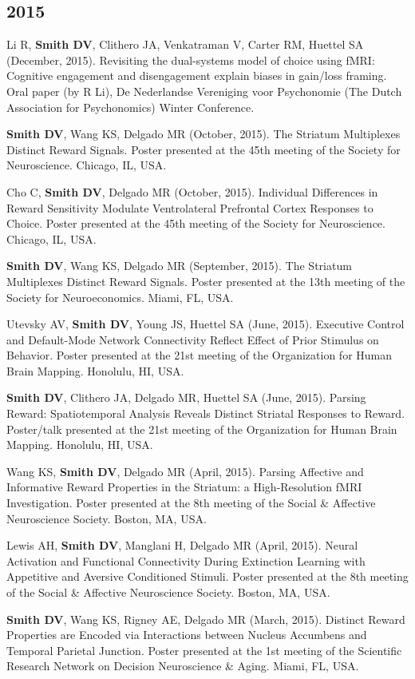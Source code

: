 \documentclass[11pt, letterpaper]{article}
\begin{document}
\subsection*{2015}
\begin{hangparas}{.5in}{1}
Li R, \textbf{Smith DV}, Clithero JA, Venkatraman V, Carter RM, Huettel SA (December, 2015). Revisiting the dual-systems model of choice using fMRI: Cognitive engagement and disengagement explain biases in gain/loss framing. Oral paper (by R Li), De Nederlandse Vereniging voor Psychonomie (The Dutch Association for Psychonomics) Winter Conference.

\textbf{Smith DV}, Wang KS, Delgado MR (October, 2015). The Striatum Multiplexes Distinct Reward Signals. Poster presented at the 45th meeting of the Society for Neuroscience. Chicago, IL, USA.

Cho C, \textbf{Smith DV}, Delgado MR (October, 2015). Individual Differences in Reward Sensitivity Modulate Ventrolateral Prefrontal Cortex Responses to Choice. Poster presented at the 45th meeting of the Society for Neuroscience. Chicago, IL, USA.

\textbf{Smith DV}, Wang KS, Delgado MR (September, 2015). The Striatum Multiplexes Distinct Reward Signals. Poster presented at the 13th meeting of the Society for Neuroeconomics. Miami, FL, USA.

Utevsky AV, \textbf{Smith DV}, Young JS, Huettel SA (June, 2015). Executive Control and Default-Mode Network Connectivity Reflect Effect of Prior Stimulus on Behavior. Poster presented at the 21st meeting of the Organization for Human Brain Mapping. Honolulu, HI, USA.

\textbf{Smith DV}, Clithero JA, Delgado MR, Huettel SA (June, 2015). Parsing Reward: Spatiotemporal Analysis Reveals Distinct Striatal Responses to Reward. Poster/talk presented at the 21st meeting of the Organization for Human Brain Mapping. Honolulu, HI, USA.

Wang KS, \textbf{Smith DV}, Delgado MR (April, 2015). Parsing Affective and Informative Reward Properties in the Striatum: a High-Resolution fMRI Investigation. Poster presented at the 8th meeting of the Social \& Affective Neuroscience Society. Boston, MA, USA.

Lewis AH, \textbf{Smith DV}, Manglani H, Delgado MR (April, 2015). Neural Activation and Functional Connectivity During Extinction Learning with Appetitive and Aversive Conditioned Stimuli. Poster presented at the 8th meeting of the Social \& Affective Neuroscience Society. Boston, MA, USA.

\textbf{Smith DV}, Wang KS, Rigney AE, Delgado MR (March, 2015). Distinct Reward Properties are Encoded via Interactions between Nucleus Accumbens and Temporal Parietal Junction. Poster presented at the 1st meeting of the Scientific Research Network on Decision Neuroscience \& Aging. Miami, FL, USA.

\end{hangparas}
\end{document}
